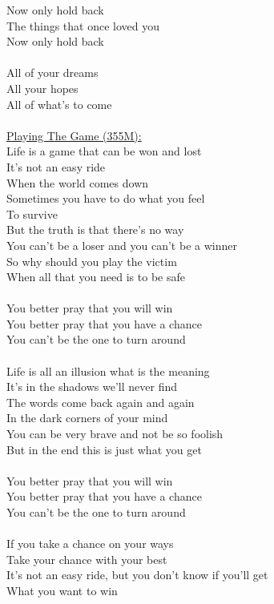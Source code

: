 \documentclass[11pt]{article}
\begin{document}
Now only hold back\\
The things that once loved you\\
Now only hold back\\
\\
All of your dreams\\
All your hopes\\
All of what's to come\\
\\
\underline{Playing The Game (355M):}\\
Life is a game that can be won and lost\\
It's not an easy ride\\
When the world comes down\\
Sometimes you have to do what you feel\\
To survive\\
But the truth is that there's no way\\
You can't be a loser and you can't be a winner\\
So why should you play the victim\\
When all that you need is to be safe\\
\\
You better pray that you will win\\
You better pray that you have a chance\\
You can't be the one to turn around\\
\\
Life is all an illusion what is the meaning\\
It's in the shadows we'll never find\\
The words come back again and again\\
In the dark corners of your mind\\
You can be very brave and not be so foolish\\
But in the end this is just what you get\\
\\
You better pray that you will win\\
You better pray that you have a chance\\
You can't be the one to turn around\\
\\
If you take a chance on your ways\\
Take your chance with your best\\
It's not an easy ride, but you don't know if you'll get\\
What you want to win\\
\end{document}
